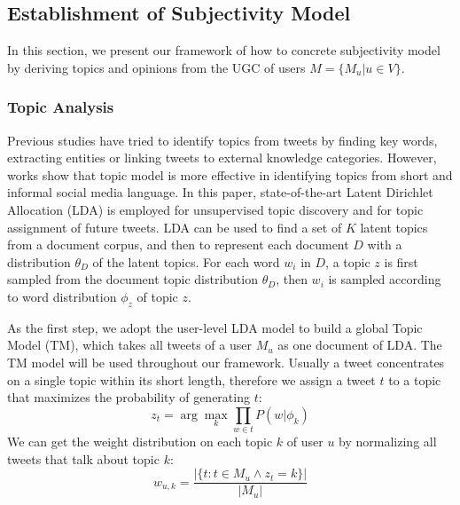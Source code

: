 \documentclass[letterpaper]{article}
\begin{document}
 
\subsection{Establishment of Subjectivity Model}
\label{establishment}

In this section, we present our framework of how to concrete subjectivity model by deriving topics and opinions from the UGC of users $ M=\lbrace M_{u}\vert u \in V\rbrace$.

\subsubsection{Topic Analysis}
\label{topic}

Previous studies have tried to identify topics from tweets by finding key words\cite{chen2010short}, extracting  entities\cite{abel2011analyzing} or linking tweets to external knowledge categories\cite{macskassy2011people}. However, works show that topic model is more effective in identifying topics from short and informal social media language\cite{hong2010empirical}. In this paper, state-of-the-art Latent Dirichlet Allocation (LDA)\cite{blei2003latent} is employed for unsupervised topic discovery and for topic assignment of future tweets. LDA can be used to find a set of $ K $ latent topics from a document corpus, and then to represent each document $ D $ with a distribution $ \theta_{D} $ of the latent topics. For each word $ w_{i} $ in $ D $, a topic $ z $ is first sampled from the document topic distribution $ \theta_{D} $, then $ w_{i} $ is sampled according to word distribution $ \phi_{z} $ of topic $ z $. 

As the first step, we adopt the user-level LDA model to build a global Topic Model (TM), which takes all tweets of a user $M_u$ as one document of LDA\cite{hong2010empirical}. The TM model will be used throughout our framework. 
Usually a tweet concentrates on a single topic within its short length, therefore we assign a tweet $ t $ to a topic that maximizes the probability of generating $ t $:
\begin{equation}
\label{twtopic}
z_{t} = \arg \max_{k}\prod_{w \in t} P(w|\phi_{k})
\end{equation}
We can get the weight distribution on each topic $ k $ of user $ u $ by normalizing all tweets that talk about topic $ k $: 
\begin{equation}
w_{u,k}=\dfrac{|\{ t: t \in M_{u} \wedge z_{t}=k\}|}{|M_{u}|}
\end{equation}
\end{document}
